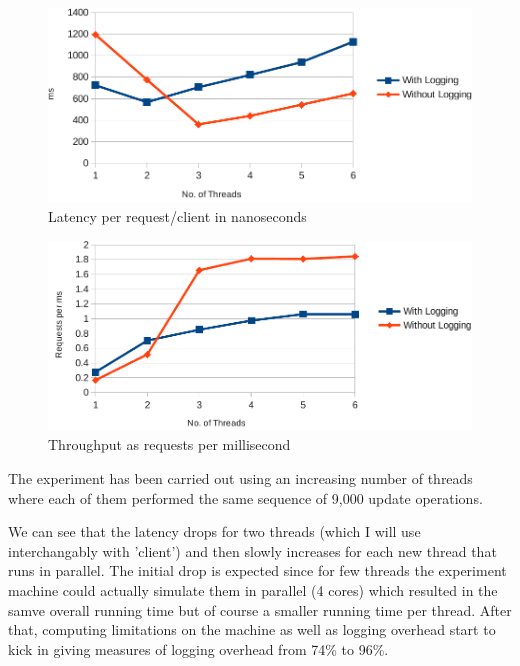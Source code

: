 \documentclass[a4paper,11pt]{article}
\begin{document}
\begin{figure}[ht]
  \centering
  \includegraphics[width=\textwidth]{../experiment/latency-crop-split.pdf}
  \caption{Latency per request/client in nanoseconds}
  \label{fig:latency}
\end{figure}

\begin{figure}[ht]
  \centering
  \includegraphics[width=\textwidth]{../experiment/throughput-crop-split.pdf}
  \caption{Throughput as requests per millisecond}
  \label{fig:throughput}  
\end{figure}

The experiment has been carried out using an increasing number of threads where each of them performed the same sequence of 9,000 update operations.

We can see that the latency drops for two threads (which I will use interchangably with 'client') and then slowly increases for each new thread that runs in parallel. The initial drop is expected since for few threads the experiment machine could actually simulate them in parallel (4 cores) which resulted in the samve overall running time but of course a smaller running time per thread. After that, computing limitations on the machine as well as logging overhead start to kick in giving measures of logging overhead from 74\% to 96\%.
\end{document}
